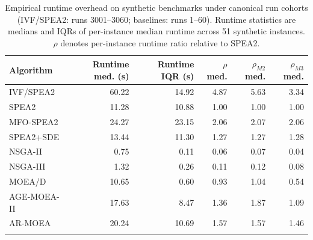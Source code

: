 \begin{table}[t]
\caption{Empirical runtime overhead on synthetic benchmarks under canonical run cohorts (IVF/SPEA2: runs 3001--3060; baselines: runs 1--60). Runtime statistics are medians and IQRs of per-instance median runtime across 51 synthetic instances. $\rho$ denotes per-instance runtime ratio relative to SPEA2.}\label{tab:runtime_overhead_baselines}
\centering\scriptsize
\begin{tabular}{lrrrrr}
\toprule
Algorithm & Runtime med. (s) & Runtime IQR (s) & $\rho$ med. & $\rho_{M2}$ med. & $\rho_{M3}$ med. \\
\midrule
IVF/SPEA2 & 60.22 & 14.92 & 4.87 & 5.63 & 3.34 \\
SPEA2 & 11.28 & 10.88 & 1.00 & 1.00 & 1.00 \\
MFO-SPEA2 & 24.27 & 23.15 & 2.06 & 2.07 & 2.06 \\
SPEA2+SDE & 13.44 & 11.30 & 1.27 & 1.27 & 1.28 \\
NSGA-II & 0.75 & 0.11 & 0.06 & 0.07 & 0.04 \\
NSGA-III & 1.32 & 0.26 & 0.11 & 0.12 & 0.08 \\
MOEA/D & 10.65 & 0.60 & 0.93 & 1.04 & 0.54 \\
AGE-MOEA-II & 17.63 & 8.47 & 1.36 & 1.87 & 1.09 \\
AR-MOEA & 20.24 & 10.69 & 1.57 & 1.57 & 1.46 \\
\botrule
\end{tabular}
\end{table}
